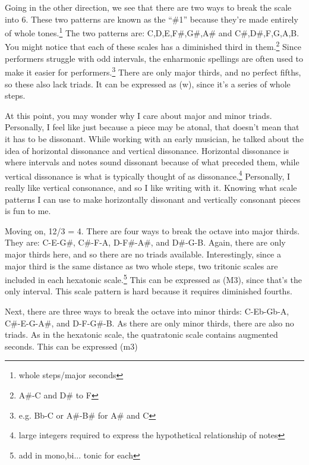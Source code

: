 \documentclass[12pt]{article}[titlepage]
\newcommand{\say}[1]{``\#1''}
\newcommand{\1}{\={a}}
\newcommand{\2}{\={e}}
\newcommand{\3}{\={\i}}
\newcommand{\4}{\=o}
\newcommand{\5}{\=u}
\newcommand{\6}{\={A}}
\renewcommand{\,}{\textsuperscript{,}}
\begin{document}
Going in the other direction, we see that there are two ways to break the scale into 6.
These two patterns are known as the \say{whole tone scale,} because they're made entirely of whole tones.\footnote{whole steps/major seconds}
The two patterns are: C,D,E,F\#,G\#,A\# and C\#,D\#,F,G,A,B.
You might notice that each of these scales has a diminished third in them.\footnote{A\#-C and D\# to F}
Since performers struggle with odd intervals, the enharmonic spellings are often used to make it easier for performers.\footnote{e.g. Bb-C or A\#-B\# for A\# and C}
There are only major thirds, and no perfect fifths, so these also lack triads.
It can be expressed as (w), since it's a series of whole steps.

At this point, you may wonder why I care about major and minor triads.
Personally, I feel like just because a piece may be atonal, that doesn't mean that it has to be dissonant.
While working with an early musician, he talked about the idea of horizontal dissonance and vertical dissonance.
Horizontal dissonance is where intervals and notes sound dissonant because of what preceded them, while vertical dissonance is what is typically thought of as dissonance.\footnote{large integers required to express the hypothetical relationship of notes}
Personally, I really like vertical consonance, and so I like writing with it.
Knowing what scale patterns I can use to make horizontally dissonant and vertically consonant pieces is fun to me.

Moving on, 12/3 = 4.
There are four ways to break the octave into major thirds.
They are: C-E-G\#, C\#-F-A, D-F\#-A\#, and D\#-G-B.
Again, there are only major thirds here, and so there are no triads available.
Interestingly, since a major third is the same distance as two whole steps, two tritonic scales are included in each hexatonic scale.\footnote{add in mono,bi... tonic for each}
This can be expressed as (M3), since that's the only interval.
This scale pattern is hard because it requires diminished fourths.

Next, there are three ways to break the octave into minor thirds: C-Eb-Gb-A, C\#-E-G-A\#, and D-F-G\#-B.
As there are only minor thirds, there are also no triads.
As in the hexatonic scale, the quatratonic scale contains augmented seconds.
This can be expressed (m3)
\end{document}
